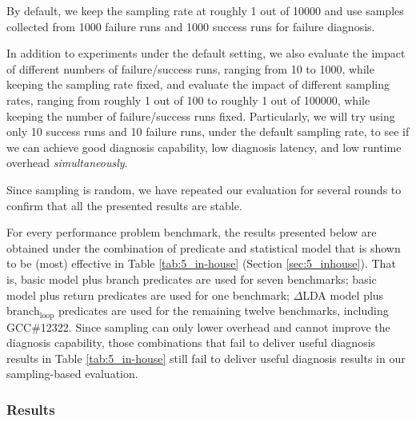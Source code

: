 By default, we keep the sampling rate at roughly
1 out of 10000
and use samples
collected from 1000 failure runs and 1000 success runs for failure diagnosis. 

In addition to experiments under the default setting, we also evaluate the 
impact of different numbers of failure/success runs, ranging from 10 to 1000,
while keeping the sampling rate fixed, and evaluate the impact of different
sampling rates, ranging from roughly 1 out of 100 to roughly 1 out of 100000,
while keeping the number of failure/success runs fixed.
Particularly, we will try using only 10 success runs
and 10 failure runs, under the default sampling rate, to see if we can achieve 
good diagnosis capability,
low diagnosis latency, and low runtime overhead \emph{simultaneously}. 

Since sampling is random, we have repeated our evaluation for several rounds to confirm that all
the presented results are stable.

For every performance problem benchmark, the results presented below are 
obtained under the
combination of predicate and statistical model that is shown to be (most) 
effective
in Table \ref{tab:5_in-house} (Section \ref{sec:5_inhouse}).
That is, basic model plus branch predicates are used for seven benchmarks;
basic model plus return predicates are used for one benchmark;
$\Delta$LDA model plus branch$_{\text{loop}}$ predicates are used for the remaining twelve  
benchmarks, including GCC\#12322.
Since sampling can only lower overhead and cannot
improve the diagnosis capability, those combinations that fail to deliver
useful diagnosis results in Table \ref{tab:5_in-house} still fail to deliver
useful diagnosis results in our sampling-based evaluation.

\subsubsection{Results}

